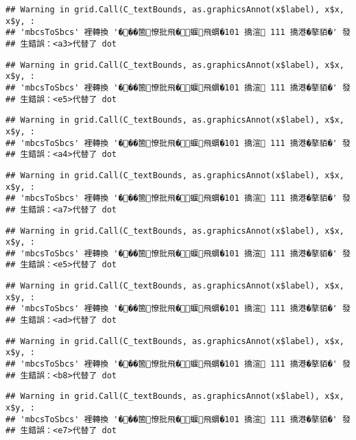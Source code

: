 \documentclass[
]{article}
\begin{document}
\begin{verbatim}
## Warning in grid.Call(C_textBounds, as.graphicsAnnot(x$label), x$x, x$y, :
## 'mbcsToSbcs' 裡轉換 '���箇憭批飛�蝘飛蝟�101 撟渲 111 撟港�摮貊�' 發
## 生錯誤：<a3>代替了 dot
\end{verbatim}

\begin{verbatim}
## Warning in grid.Call(C_textBounds, as.graphicsAnnot(x$label), x$x, x$y, :
## 'mbcsToSbcs' 裡轉換 '���箇憭批飛�蝘飛蝟�101 撟渲 111 撟港�摮貊�' 發
## 生錯誤：<e5>代替了 dot
\end{verbatim}

\begin{verbatim}
## Warning in grid.Call(C_textBounds, as.graphicsAnnot(x$label), x$x, x$y, :
## 'mbcsToSbcs' 裡轉換 '���箇憭批飛�蝘飛蝟�101 撟渲 111 撟港�摮貊�' 發
## 生錯誤：<a4>代替了 dot
\end{verbatim}

\begin{verbatim}
## Warning in grid.Call(C_textBounds, as.graphicsAnnot(x$label), x$x, x$y, :
## 'mbcsToSbcs' 裡轉換 '���箇憭批飛�蝘飛蝟�101 撟渲 111 撟港�摮貊�' 發
## 生錯誤：<a7>代替了 dot
\end{verbatim}

\begin{verbatim}
## Warning in grid.Call(C_textBounds, as.graphicsAnnot(x$label), x$x, x$y, :
## 'mbcsToSbcs' 裡轉換 '���箇憭批飛�蝘飛蝟�101 撟渲 111 撟港�摮貊�' 發
## 生錯誤：<e5>代替了 dot
\end{verbatim}

\begin{verbatim}
## Warning in grid.Call(C_textBounds, as.graphicsAnnot(x$label), x$x, x$y, :
## 'mbcsToSbcs' 裡轉換 '���箇憭批飛�蝘飛蝟�101 撟渲 111 撟港�摮貊�' 發
## 生錯誤：<ad>代替了 dot
\end{verbatim}

\begin{verbatim}
## Warning in grid.Call(C_textBounds, as.graphicsAnnot(x$label), x$x, x$y, :
## 'mbcsToSbcs' 裡轉換 '���箇憭批飛�蝘飛蝟�101 撟渲 111 撟港�摮貊�' 發
## 生錯誤：<b8>代替了 dot
\end{verbatim}

\begin{verbatim}
## Warning in grid.Call(C_textBounds, as.graphicsAnnot(x$label), x$x, x$y, :
## 'mbcsToSbcs' 裡轉換 '���箇憭批飛�蝘飛蝟�101 撟渲 111 撟港�摮貊�' 發
## 生錯誤：<e7>代替了 dot
\end{verbatim}
\end{document}
